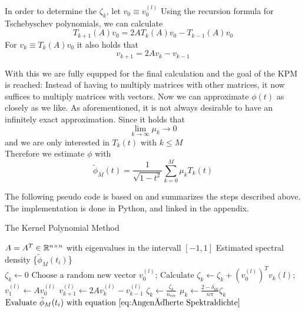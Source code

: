 In order to determine the $\zeta_k$, let $v_0 \equiv v_0^{(l)}$
Using the recursion formula for Tschebyschev polynomials, we can calculate
\[
T_{k + 1}(A)v_0 = 2 A T_k(A) v_0 - T_{k - 1}(A) v_0
\]
For $v_k \equiv T_k(A)v_0$ it also holds that
\[
v_{k + 1} = 2 A v_k - v_{k - 1}
\]

With this we are fully equpped for the final calculation and the goal of the KPM is reached:
Instead of having to multiply matrices with other matrices, it now suffices to multiply matrices with vectors.
Now we can approximate $\phi(t)$ as closely as we like.
As aforementioned, it is not always desirable to have an infinitely exact approximation.
Since it holds that
\[
\lim \limits_{k \to \infty} \mu_k \to 0
\]
and we are only interested in $T_k(t)$ with $k \leq M$\\
Therefore we estimate $\phi$ with
\begin{equation} \label{eq:Angenäherte Spektraldichte}
    \tilde{\phi}_M(t) = \frac{1}{\sqrt{1 - t^2}} \sum_{k = 0}^{M} \mu_k T_k(t)
\end{equation}

The following pseudo code is based on \cite[p.~10]{linsaadyang14} and summarizes the steps described above.
The implementation is done in Python, and linked in the appendix.

\begin{algorithm}
    \caption{The Kernel Polynomial Method}\label{alg:cap}
    \begin{algorithmic}[5]
    \Require $A = A^T \in \mathbb{R}^{n \times n}$ with eigenvalues in the intervall $[-1, 1]$
    \Ensure Estimated spectral density \{$\tilde{\phi}_M(t_i)$\}\\
    \State $\zeta_k \gets 0$
    \EndFor
    \State $\text{Choose a random new vector } v_0^{(l)}\text{;}$ 
    \State $\text{Calculate } \zeta_k \gets \zeta_k + \left( v_0^{(l)} \right)^T v_k{(l)}\text{;}$  
    \State $v_1^{(l)} \gets A v_0^{(l)}$
    \Else
    \State $v_{k+1}^{(l)} \gets 2 A v_k^{(l)} - v_{k-1}^{(l)}$ 
    \EndIf
    \EndFor
    \EndFor
    \State $\zeta_k \gets \frac{\zeta_k}{n_{\text{vec}}}$
    \State $\mu_k \gets \frac{2 - \delta_{k0}}{n \pi} \zeta_k$
    \EndFor
    \State $\text{Evaluate } \tilde{\phi}_M(t_i) \text{ with equation } \ref{eq:Angenäherte Spektraldichte}$
    \end{algorithmic}
\end{algorithm}